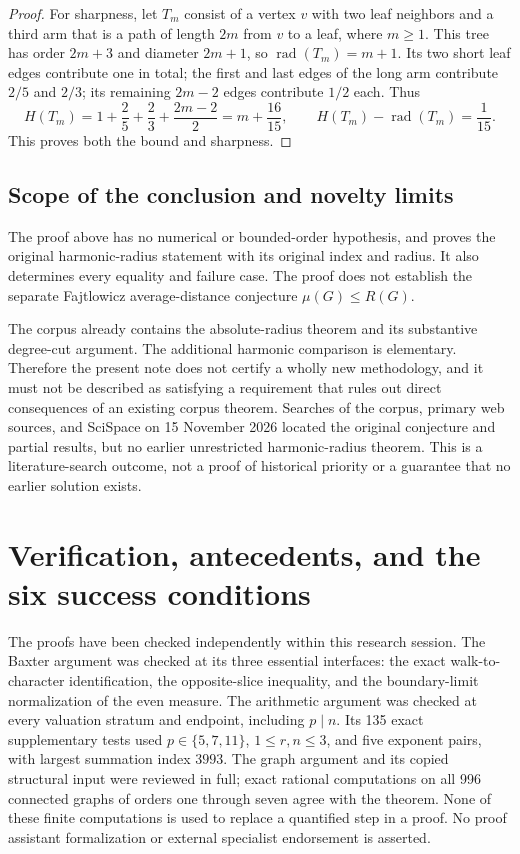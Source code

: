 \documentclass[11pt,a4paper]{article}
\theoremstyle{remark}\newtheorem{remark}[theorem]{Remark}
\newcommand{\rad}{\operatorname{rad}}\newcommand{\diam}{\operatorname{diam}}\newcommand{\dist}{\operatorname{dist}}
\numberwithin{equation}{section}
\begin{document}
\begin{proof}
For sharpness, let $T_m$ consist of a vertex $v$ with two leaf neighbors
and a third arm that is a path of length $2m$ from $v$ to a leaf,
where $m\ge1$. This tree has order $2m+3$ and diameter $2m+1$, so
$\rad(T_m)=m+1$. Its two short leaf edges contribute one in total;
the first and last edges of the long arm contribute $2/5$ and $2/3$;
its remaining $2m-2$ edges contribute $1/2$ each. Thus
\[
 H(T_m)=1+\frac25+\frac23+\frac{2m-2}{2}
 =m+\frac{16}{15},
 \qquad H(T_m)-\rad(T_m)=\frac1{15}.
\]
This proves both the bound and sharpness.
\end{proof}

\subsection{Scope of the conclusion and novelty limits}
The proof above has no numerical or bounded-order hypothesis, and proves
the original harmonic-radius statement with its original index and
radius. It also determines every equality and failure case.
The proof does not establish the separate Fajtlowicz average-distance
conjecture $\mu(G)\le R(G)$.

The corpus already contains the absolute-radius theorem and its
substantive degree-cut argument. The additional harmonic comparison is
elementary. Therefore the present note does not certify a wholly new
methodology, and it must not be described as satisfying a requirement
that rules out direct consequences of an existing corpus theorem.
Searches of the corpus, primary web sources, and SciSpace on
15 November 2026 located the original conjecture and partial results,
but no earlier unrestricted harmonic-radius theorem.
This is a literature-search outcome, not a proof of historical priority
or a guarantee that no earlier solution exists.


\section{Verification, antecedents, and the six success conditions}
\label{sec:status}
The proofs have been checked independently within this research session.
The Baxter argument was checked at its three essential interfaces:
the exact walk-to-character identification, the opposite-slice inequality,
and the boundary-limit normalization of the even measure. The arithmetic
argument was checked at every valuation stratum and endpoint, including
$p\mid n$. Its 135 exact supplementary tests used $p\in\{5,7,11\}$,
$1\le r,n\le3$, and five exponent pairs, with largest summation index
$3993$. The graph argument and its copied structural input were reviewed
in full; exact rational computations on all 996 connected graphs of
orders one through seven agree with the theorem. None of these finite
computations is used to replace a quantified step in a proof. No proof
assistant formalization or external specialist endorsement is asserted.
\end{document}
